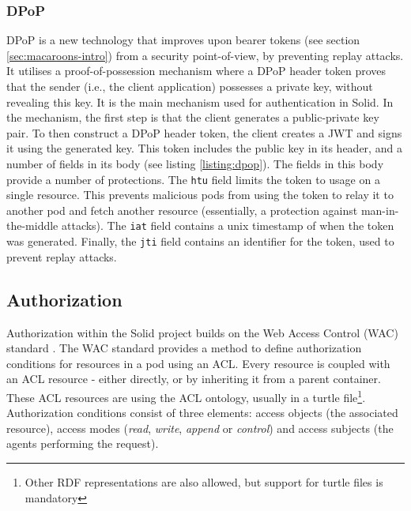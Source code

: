 \subsubsection{DPoP}
\label{sec:dpop}
\acrfull{DPoP} \citep{ietf-oauth-dpop} is a new technology that improves upon bearer tokens (see section \ref{sec:macaroons-intro}) from a security point-of-view, by preventing replay attacks. It utilises a proof-of-possession mechanism where a \gls{DPoP} header token proves that the sender (i.e., the client application) possesses a private key, without revealing this key. It is the main mechanism used for authentication in Solid. In the mechanism, the first step is that the client generates a public-private key pair. To then construct a \gls{DPoP} header token, the client creates a \gls{JWT} and signs it using the generated key. This token includes the public key in its header, and a number of fields in its body (see listing \ref{listing:dpop}).
{}
\noindent The fields in this body provide a number of protections. The \texttt{htu} field limits the token to usage on a single resource. This prevents malicious pods from using the token to relay it to another pod and fetch another resource (essentially, a protection against man-in-the-middle attacks). The \texttt{iat} field contains a unix timestamp of when the token was generated. Finally, the \texttt{jti} field contains an identifier for the token, used to prevent replay attacks.

\newpage
\subsection{Authorization}
\label{sec:solid-authorization}
Authorization within the Solid project builds on the Web Access Control (WAC) standard \citep{wac}. The WAC standard provides a method to define authorization conditions for resources in a pod using an \gls{ACL}. Every resource is coupled with an \gls{ACL} resource - either directly, or by inheriting it from a parent container. These \gls{ACL} resources are using the \gls{ACL} ontology, usually in a turtle file\footnote{Other \gls{RDF} representations are also allowed, but support for turtle files is mandatory}. Authorization conditions consist of three elements: access objects (the associated resource), access modes (\textit{read}, \textit{write}, \textit{append} or \textit{control}) and access subjects (the agents performing the request).

